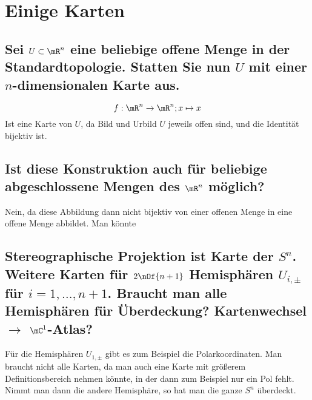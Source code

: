 \section{Einige Karten}

\subsection{Sei $U \subset \mR^n$ eine beliebige offene Menge in der Standardtopologie. Statten Sie nun $U$ mit einer $n$-dimensionalen Karte aus.}
\begin{equation}
	f : \mR^n \to \mR^n; x \mapsto x
\end{equation}
Ist eine Karte von $U$, da Bild und Urbild $U$ jeweils offen sind, und die Identität bijektiv ist.

\subsection{Ist diese Konstruktion auch für beliebige abgeschlossene Mengen des $\mR^n$ möglich?}
Nein, da diese Abbildung dann nicht bijektiv von einer offenen Menge in eine offene Menge abbildet. Man könnte 

\subsection{Stereographische Projektion ist Karte der $S^n$. Weitere Karten für $2\nOf{n+1}$ Hemisphären $U_{i,\pm}$ für $i = 1,\dots,n+1$. Braucht man alle Hemisphären für Überdeckung? Kartenwechsel $\rightarrow$ $\mC^1$-Atlas?}
Für die Hemisphären $U_{1,\pm}$ gibt es zum Beispiel die Polarkoordinaten.
Man braucht nicht alle Karten, da man auch eine Karte mit größerem Definitionsbereich nehmen könnte, in der dann zum Beispiel nur ein Pol fehlt. Nimmt man dann die andere Hemisphäre, so hat man die ganze $S^n$ überdeckt.